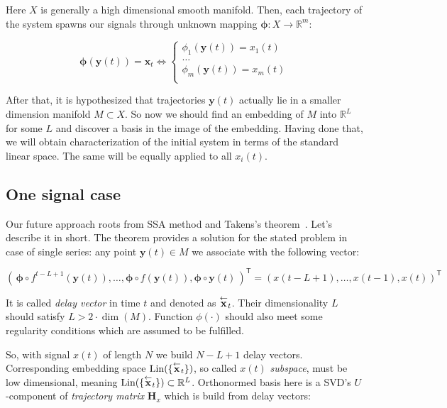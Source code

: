 	Here $ X $ is generally a high dimensional smooth manifold. Then, each trajectory of the system spawns our signals through unknown mapping $ \boldsymbol{\phi}: X \to \mathbb{R}^m $:
	
	\begin{equation*}
		\boldsymbol{\phi}(\mathbf{y}(t)) = \mathbf{x}_t \Leftrightarrow \begin{cases}
			\phi_1(\mathbf{y}(t)) = x_1(t) \\
			\ldots \\
			\phi_m(\mathbf{y}(t)) = x_m(t) \\
		\end{cases}
	\end{equation*}
	
	After that, it is hypothesized that trajectories $ \mathbf{y}(t) $ actually lie in a smaller dimension manifold $ M \subset X $. So now we should find an embedding of $ M $ into $ \mathbb{R}^{L} $ for some $ L $ and discover a basis in the image of the embedding. Having done that, we will obtain characterization of the initial system in terms of the standard linear space. The same will be equally applied to all $ x_i(t) $.
	
	\subsection*{One signal case}
	
	Our future approach roots from SSA method and Takens's theorem~\cite{citeulike:2735031}. Let's describe it in short. The theorem provides a solution for the stated problem in case of single series: any point $ \mathbf{y}(t) \in M $ we associate with the following vector:
	
	\[
	( \, \boldsymbol{\phi} \circ f^{t - L + 1}(\mathbf{y}(t)), \ldots , \boldsymbol{\phi} \circ f(\mathbf{y}(t)), \boldsymbol{\phi} \circ \mathbf{y}(t) \,)^{\mathsf{T}} = (x(t - L + 1), \ldots , x(t-1), x(t))^{\mathsf{T}}
	\] 
	
	It is called \emph{delay vector} in time $ t $ and denoted as $ \overset{\leftarrow}{\mathbf{x}}_{t} $. Their dimensionality $ L $ should satisfy $ L > 2 \cdot \dim(M) $. Function $ \phi(\cdot) $ should also meet some regularity conditions which are assumed to be fulfilled.
	
	So, with signal $ x(t) $ of length $ N $ we build $ N - L + 1 $ delay vectors. Corresponding embedding space $ \text{Lin}(\{\overset{\leftarrow}{\mathbf{x}}_{t}\}) $, so called $ x(t) $ \emph{subspace}, must be low dimensional, meaning $ \text{Lin}(\{\overset{\leftarrow}{\mathbf{x}}_{t}\}) \subset \mathbb{R}^L $. Orthonormed basis here is a SVD's $ U $-component of \emph{trajectory matrix} $ \mathbf{H}_x $ which is build from delay vectors:
	
